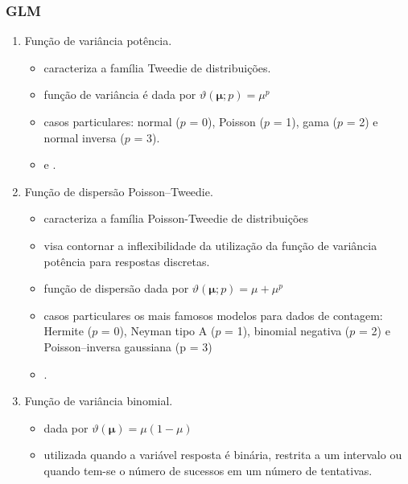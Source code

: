 \documentclass[handout,serif, professionalfont, usenames, dvipsnames, aspectratio = 169]{beamer}\usepackage[]{graphicx}\usepackage[]{color}
\begin{document}

\begin{frame}

  \frametitle{GLM}
  
  \begin{enumerate}
  \item Função de variância potência. 
  
    \begin{itemize}
      \item caracteriza a família Tweedie de distribuições.
      \item função de variância é dada por $\vartheta\left(\boldsymbol{\mu}; p\right) = \mu^p$
      \item casos particulares: normal ($p$ = 0), Poisson ($p$ = 1), gama ($p$ = 2) e normal inversa ($p$ = 3). 
      \item \cite{Jorgensen87} e \cite{Jorgensen97}.
    \end{itemize}

  
  \item Função de dispersão Poisson–Tweedie.
  
    \begin{itemize}
      \item caracteriza a família Poisson-Tweedie de distribuições
      \item visa contornar a inflexibilidade da utilização da função de variância potência para respostas discretas. 
      \item função de dispersão dada por $\vartheta\left(\boldsymbol{\mu}; p\right) = \mu + \mu^p$
      \item casos particulares os mais famosos modelos para dados de contagem: Hermite ($p$ = 0), Neyman tipo A ($p$ = 1), binomial negativa ($p$ = 2) e Poisson–inversa gaussiana (p = $3$) 
      \item \cite{Jorgensen15}.
      
    \end{itemize}

  \item Função de variância binomial. 
  
    \begin{itemize}
      \item dada por $\vartheta(\boldsymbol{\mu}) = \mu(1 - \mu)$
      \item utilizada quando a variável resposta é binária, restrita a um intervalo ou quando tem-se o número de sucessos em um número de tentativas.
    \end{itemize}

\end{enumerate}

\end{frame}
\end{document}
